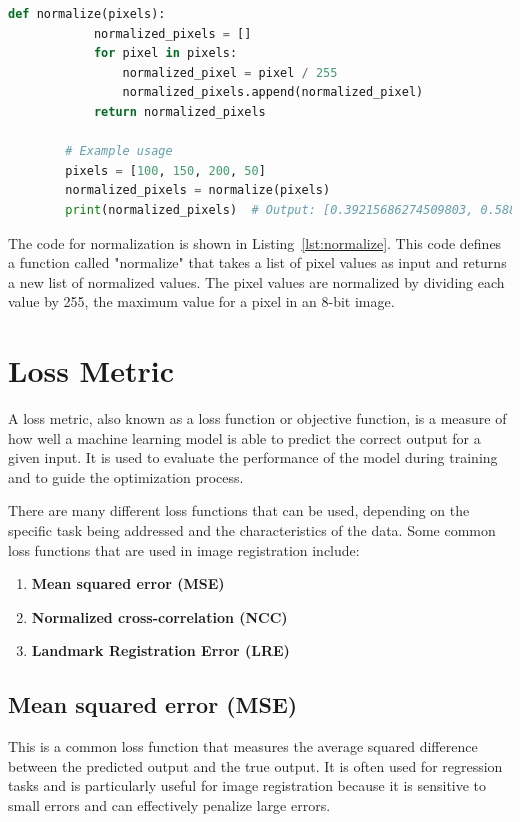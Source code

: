 \documentclass{book}
\begin{document}
	\begin{lstlisting}[language=python, label=lst:normalize, caption=Pseudo function to show the normalization of pixel intensity values.]
		def normalize(pixels):
			normalized_pixels = []
			for pixel in pixels:
				normalized_pixel = pixel / 255
				normalized_pixels.append(normalized_pixel)
			return normalized_pixels
	
		# Example usage
		pixels = [100, 150, 200, 50]
		normalized_pixels = normalize(pixels)
		print(normalized_pixels)  # Output: [0.39215686274509803, 0.5882352941176471, 0.7843137254901961, 0.19607843137254902]
	\end{lstlisting}
	
	The code for normalization is shown in Listing~\ref{lst:normalize}. This code defines a function called "normalize" that takes a list of pixel values as input and returns a new list of normalized values. The pixel values are normalized by dividing each value by 255, the maximum value for a pixel in an 8-bit image.
	
	\section{Loss Metric}\label{sec:loss_metric}
	A loss metric, also known as a loss function or objective function, is a measure of how well a machine learning model is able to predict the correct output for a given input. It is used to evaluate the performance of the model during training and to guide the optimization process.
	
	There are many different loss functions that can be used, depending on the specific task being addressed and the characteristics of the data. Some common loss functions that are used in image registration include:
	
	\begin{enumerate}
		\item \textbf{Mean squared error (MSE)}
		\item \textbf{Normalized cross-correlation (NCC)}
		\item \textbf{Landmark Registration Error (LRE)}
	\end{enumerate}
	
	\subsection{Mean squared error (MSE)}
	This is a common loss function that measures the average squared difference between the predicted output and the true output. It is often used for regression tasks and is particularly useful for image registration because it is sensitive to small errors and can effectively penalize large errors.
	
\end{document}
